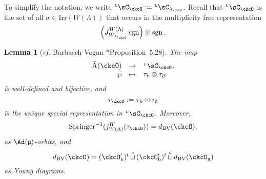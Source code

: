 \documentclass[12pt,a4paper]{amsart}
\newcommand{\sgn}{\operatorname{sgn}}
\newcommand{\g}{\mathfrak g}
\numberwithin{equation}{section}
\newtheorem{lem}[thm]{Lemma}
\theoremstyle{remark}
\def\half{{\tfrac{1}{2}}}
\def\cf{\emph{cf.} }
\def\Irr{\mathrm{Irr}}
\def\dBV{d_{\mathrm{BV}}}
\def\lamck{\lambda_\ckcO}
\def\WLamck{W_{[\lambda_{\ckcO}]}}
\def\Wlamck{W_{\lamck}}
\def\LC{{}^{\scriptscriptstyle L}\sC}
\def\cupcol{{\stackrel{c}{\sqcup}}}
\def\Spr{\mathrm{Springer}}
\def\imathp{\imath_{\wp}}
\def\jmathp{\jmath_{\wp}}
\def\cupcol{{\,\stackrel{c}{\sqcup}\,}}
\def\ckcOpb{\ckcO'_{\mathrm b}}
\def\ckcOg{\ckcO_{\mathrm g}}
\begin{document}
  To simplify the notation, we write $\LC_{\ckcO}:= \LC_{\lambda_{\ckcO}}$. Recall that $\LC_{\ckcO}$ is the set of all $\sigma\in \Irr(W(\Lambda))$  that occurs in the multiplicity free representation
   \[
    \left(J_{\Wlamck}^{W(\Lambda)} \sgn\right) \otimes \sgn.
  \]


  \begin{lem}[\cf Barbasch-Vogan {\cite{BVUni}*{Proposition~5.28}}]
    \label{lem:Lcell}
    The
  map    \[
      \begin{array}{rcl}
        \bar{\mathrm A}(\ckcO) & \rightarrow & \LC_{\ckcO},\\
                       \bar \wp & \mapsto &  \tau_{\mathrm b} \otimes \tau_{\bar \wp}
      \end{array}
    \]
    is well-defined and bijective, and
        \[
      \tau_{\ckcO}:=\tau_{\mathrm b}\otimes \tau_{\emptyset}
    \] is the unique special representation in $\LC_{\ckcO}$.
 Moreover,
    \begin{equation}\label{eq:dBV.W}
      \Spr ^{-1}(j_{W(\Lambda)}^{W}(\tau_{\ckcO}))
      = \dBV(\ckcO),
       \end{equation}
    as $\Ad(\g)$-orbits,
    and
  \begin{equation}\label{eq:dBV.W2}
     \dBV(\ckcO)=   (\ckcOpb)^{t} \cupcol (\ckcOpb)^{t}\cupcol \dBV(\ckcOg)
   \end{equation}
as Young diagrams.
        \end{lem}

\end{document}
